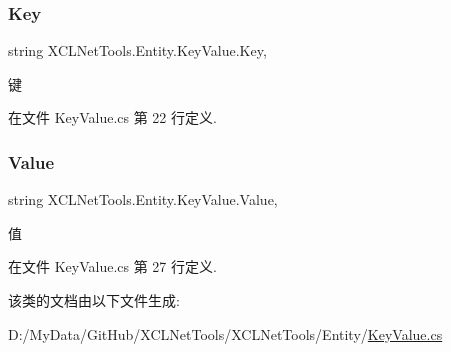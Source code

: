 \subsubsection{\texorpdfstring{Key}{Key}}
{\footnotesize\ttfamily string X\+C\+L\+Net\+Tools.\+Entity.\+Key\+Value.\+Key\hspace{0.3cm}{\ttfamily [get]}, {\ttfamily [set]}}



键 



在文件 Key\+Value.\+cs 第 22 行定义.

\mbox{\label{class_x_c_l_net_tools_1_1_entity_1_1_key_value_a9ec3c76143930f64c1e0de2074514bae}} 
\subsubsection{\texorpdfstring{Value}{Value}}
{\footnotesize\ttfamily string X\+C\+L\+Net\+Tools.\+Entity.\+Key\+Value.\+Value\hspace{0.3cm}{\ttfamily [get]}, {\ttfamily [set]}}



值 



在文件 Key\+Value.\+cs 第 27 行定义.



该类的文档由以下文件生成\+:\begin{DoxyCompactItemize}
\item 
D\+:/\+My\+Data/\+Git\+Hub/\+X\+C\+L\+Net\+Tools/\+X\+C\+L\+Net\+Tools/\+Entity/\hyperlink{_key_value_8cs}{Key\+Value.\+cs}\end{DoxyCompactItemize}
